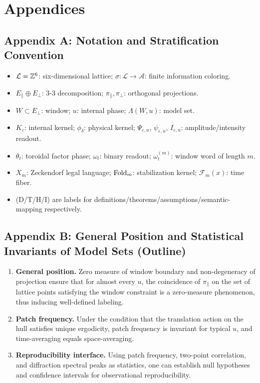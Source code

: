 \section{Appendices}

\subsection{Appendix A: Notation and Stratification Convention}
\label{app:notation}

\begin{itemize}
  \item $\mathcal{L}=\mathbb{Z}^6$: six-dimensional lattice; $\sigma:\mathcal{L}\to\mathcal{A}$: finite information coloring.
  \item $E_{\parallel}\oplus E_{\perp}$: 3-3 decomposition; $\pi_{\parallel},\pi_{\perp}$: orthogonal projections.
  \item $W\subset E_{\perp}$: window; $u$: internal phase; $\Lambda(W,u)$: model set.
  \item $K_{\varepsilon}$: internal kernel; $\phi_{\delta}$: physical kernel; $\Psi_{\varepsilon,u}$, $\psi_{\varepsilon,u}$, $I_{\varepsilon,u}$: amplitude/intensity readout.
  \item $\theta_t$: toroidal factor phase; $\omega_t$: binary readout; $\omega_t^{(m)}$: window word of length $m$.
  \item $X_m$: Zeckendorf legal language; $\mathrm{Fold}_m$: stabilization kernel; $\mathcal{F}_m(x)$: time fiber.
  \item (D/T/H/I) are labels for definitions/theorems/assumptions/semantic-mapping respectively.
\end{itemize}

\subsection{Appendix B: General Position and Statistical Invariants of Model Sets (Outline)}
\label{app:general-position}

\begin{enumerate}
  \item \textbf{General position.} Zero measure of window boundary and non-degeneracy of projection ensure that for almost every $u$, the coincidence of $\pi_{\parallel}$ on the set of lattice points satisfying the window constraint is a zero-measure phenomenon, thus inducing well-defined labeling.
  \item \textbf{Patch frequency.} Under the condition that the translation action on the hull satisfies unique ergodicity, patch frequency is invariant for typical $u$, and time-averaging equals space-averaging.
  \item \textbf{Reproducibility interface.} Using patch frequency, two-point correlation, and diffraction spectral peaks as statistics, one can establish null hypotheses and confidence intervals for observational reproducibility.
\end{enumerate}

